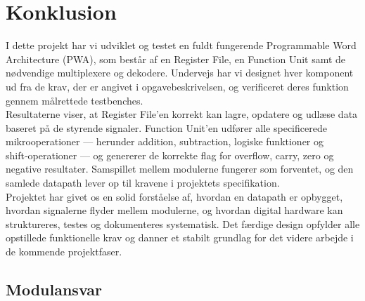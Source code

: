 \documentclass{article}
\begin{document}
\fi

\section{Konklusion}
\label{sec:conclusion}
I dette projekt har vi udviklet og testet en fuldt fungerende Programmable Word Architecture (PWA), som består af en Register File, en Function Unit samt de nødvendige multiplexere og dekodere. Undervejs har vi designet hver komponent ud fra de krav, der er angivet i opgavebeskrivelsen, og verificeret deres funktion gennem målrettede testbenches.\\
Resultaterne viser, at Register File’en korrekt kan lagre, opdatere og udlæse data baseret på de styrende signaler. Function Unit’en udfører alle specificerede mikrooperationer — herunder addition, subtraction, logiske funktioner og shift‑operationer — og genererer de korrekte flag for overflow, carry, zero og negative resultater. Samspillet mellem modulerne fungerer som forventet, og den samlede datapath lever op til kravene i projektets specifikation.\\
Projektet har givet os en solid forståelse af, hvordan en datapath er opbygget, hvordan signalerne flyder mellem modulerne, og hvordan digital hardware kan struktureres, testes og dokumenteres systematisk. Det færdige design opfylder alle opstillede funktionelle krav og danner et stabilt grundlag for det videre arbejde i de kommende projektfaser.

\subsection*{Modulansvar}
\end{document}
